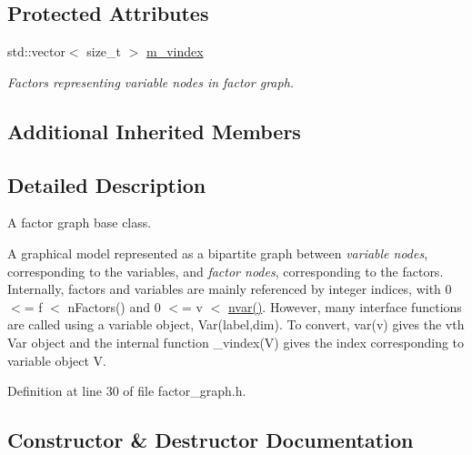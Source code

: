 \subsection*{Protected Attributes}
\begin{DoxyCompactItemize}
\item 
\hypertarget{classmerlin_1_1factor__graph_a0bbad915cf9b946de03f94670616cf80}{}std\+::vector$<$ size\+\_\+t $>$ \hyperlink{classmerlin_1_1factor__graph_a0bbad915cf9b946de03f94670616cf80}{m\+\_\+vindex}\label{classmerlin_1_1factor__graph_a0bbad915cf9b946de03f94670616cf80}

\begin{DoxyCompactList}\small\item\em Factors representing variable nodes in factor graph. \end{DoxyCompactList}\end{DoxyCompactItemize}
\subsection*{Additional Inherited Members}


\subsection{Detailed Description}
A factor graph base class. 

A graphical model represented as a bipartite graph between {\itshape variable nodes}, corresponding to the variables, and {\itshape factor nodes}, corresponding to the factors. Internally, factors and variables are mainly referenced by integer indices, with 0 $<$= f $<$ n\+Factors() and 0 $<$= v $<$ \hyperlink{classmerlin_1_1graphical__model_af70ee4f7a4414fac4f7568e3c0e5efca}{nvar()}. However, many interface functions are called using a variable object, Var(label,dim). To convert, var(v) gives the vth Var object and the internal function \+\_\+vindex(\+V) gives the index corresponding to variable object V. 

Definition at line 30 of file factor\+\_\+graph.\+h.



\subsection{Constructor \& Destructor Documentation}
\hypertarget{classmerlin_1_1factor__graph_ad7a6caf6041a1911e3afa977c4c9f06c}{}
